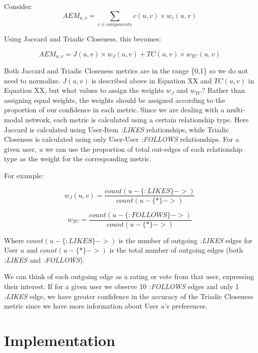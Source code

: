 Consider: 
\begin{equation}
AEM_{u,v} = \sum_{c \in components} c(u, v) \times w_c(u,v)  
\end{equation}

Using Jaccard and Triadic Closeness, this becomes:

\begin{equation}
AEM_{u,v} = J(u,v) \times w_J(u,v) + TC(u,v) \times w_{TC}(u,v)
\end{equation}

Both Jaccard and Triadic Closeness metrics are in the range \{0,1\} so we do not need to normalize.  $J(u,v)$ is described above in Equation XX and $TC(u,v)$ in Equation XX, but what values to assign the weights $w_J$ and $w_{TC}$? Rather than assigning equal weights, the weights should be assigned according to the proportion of our confidence in each metric. Since we are dealing with a multi-modal network, each metric is calculated using a certain relationship type. Here Jaccard is calculated using User-Item \textit{:LIKES} relationships, while Triadic Closeness is calculated using only User-User \textit{:FOLLOWS} relationships. For a given user, $u$ we can use the proportion of total out-edges of each relationship type as the weight for the corresponding metric.

For example:

\begin{equation}
w_J(u,v) = \frac{count(u-\{:LIKES\}->)}{count(u-\{*\}->)}
\end{equation}

\begin{equation}
w_{TC} = \frac{count(u-\{:FOLLOWS\}->)}{count(u-\{*\}->)}
\end{equation}

Where $count(u-\{:LIKES\}->)$ is the number of outgoing \textit{:LIKES} edges for User $u$ and $count(u-\{*\}->)$ is the total number of outgoing edges (both \textit{:LIKES} and \textit{:FOLLOWS}).  

We can think of each outgoing edge as a rating or vote from that user, expressing their interest. If for a given user we observe 10 \textit{:FOLLOWS} edges and only 1 \textit{:LIKES} edge, we have greater confidence in the accuracy of the Triadic Closeness metric since we have more information about User $u$'s preferences. 

\section{Implementation}

